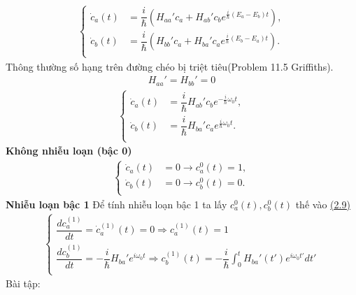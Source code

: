 \documentclass{report}
\newcommand{\dps}{\displaystyle}
\newcommand{\f}[2]{\dfrac{#1}{#2}}
\begin{document}
\begin{align}
	\begin{cases}
		\dot{c}_a(t) &= \f{i}{\hbar} \left( H_{aa}' c_a +  H_{ab}' c_b e^{\frac{i}{\hbar} (E_a - E_b)t} \right),	\\
		\dot{c}_b(t) &= \f{i}{\hbar} \left( H_{bb}' c_a +  H_{ba}' c_a e^{\frac{i}{\hbar} (E_b - E_a)t} \right).	\\
	\end{cases}
\end{align}
Thông thường số hạng trên đường chéo bị triệt tiêu(Problem 11.5 Griffiths).
\begin{align}
	 H_{aa}' =  H_{bb}' = 0
\end{align}
\begin{align}
	\begin{cases}
		\dot{c}_a(t) &= \f{i}{\hbar}  H_{ab}' c_b e^{-\frac{i}{\hbar}\omega_0t },	\\
		\dot{c}_b(t) &= \f{i}{\hbar}  H_{ba}' c_a e^{\frac{i}{\hbar} \omega_0t}.	\\
	\end{cases}\label{eq2.9}
\end{align}
\textbf{Không nhiễu loạn (bậc 0)}
\begin{align}
	\begin{cases}
		\dot{c}_a(t) &= 0 \rightarrow c_a^{0}(t) = 1, \\
		\dot{c}_b(t) &= 0 \rightarrow c_b^{0}(t) = 0. \\
	\end{cases}
\end{align}
\textbf{Nhiễu loạn bậc 1}
Để tính nhiễu loạn bậc 1 ta lấy $c_a^{0}(t),c_b^{0}(t)$ thế vào \hyperref[eq2.9]{(2.9)}
\begin{align}
	\begin{cases}
		\f{d c_{a}^{(1)}}{dt}=\dot{c}^{(1)}_a(t) = 0 \Rightarrow c^{(1)}_a(t) = 1 \\
		\f{d c_{b}^{(1)}}{dt}= - \f{i}{\hbar}  H_{ba}' e^{i\omega_0 t} \Rightarrow c^{(1)}_{b}(t) = -\f{i}{\hbar} \dps\int_{0}^{t} H_{ba}' (t') e^{i\omega_0 t'} dt'   \\
	\end{cases}
\end{align}
Bài tập:
\end{document}
